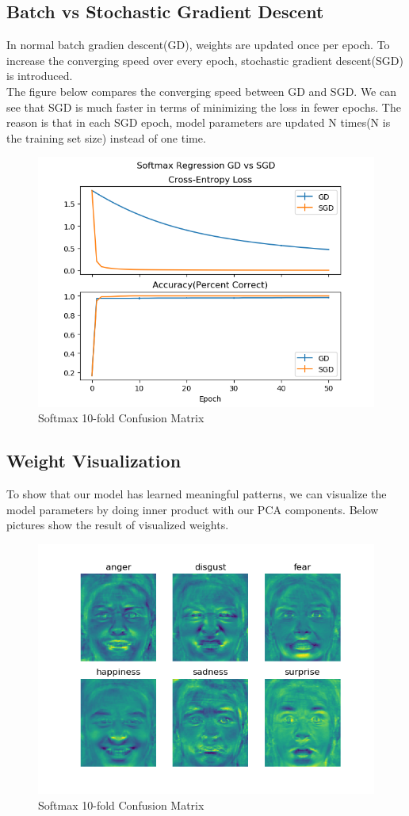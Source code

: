 \documentclass{article} %
\begin{document}
\subsection {Batch vs Stochastic Gradient Descent}
In normal batch gradien descent(GD), weights are updated once per epoch. To increase the converging speed over every epoch, stochastic gradient descent(SGD) is introduced.\\
The figure below compares the converging speed between GD and SGD. We can see that SGD is much faster in terms of minimizing the loss in fewer epochs. The reason is that in each SGD epoch, model parameters are updated N times(N is the training set size) instead of one time.
\begin{figure}[h]
	\centering
	\includegraphics[scale=0.5]{./graph/gd_vs_sgd.png}
	\caption{Softmax 10-fold Confusion Matrix}
\end{figure}
\subsection {Weight Visualization}
To show that our model has learned meaningful patterns, we can visualize the model parameters by doing inner product with our PCA components. Below pictures show the result of visualized weights.
\begin{figure}[h]
	\centering
	\includegraphics[scale=0.5]{./graph/softmax_weight.png}
	\caption{Softmax 10-fold Confusion Matrix}
\end{figure}
\end{document}
